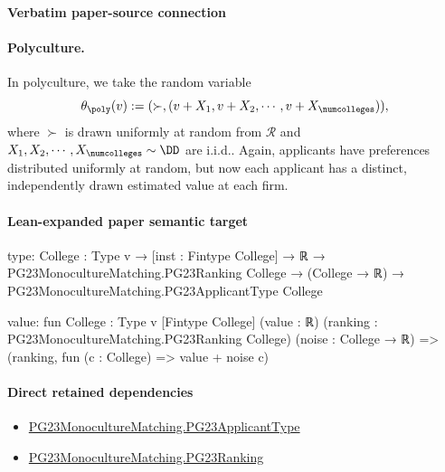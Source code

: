 \documentclass[10pt]{article}
\begin{document}
\paragraph{Verbatim paper-source connection}
\begin{ReviewVerbatim}
\paragraph{Polyculture.} In polyculture, we take the random variable
\begin{equation}
    \theta_{\poly}(v) := (\succ, (v + X_1, v + X_2, \cdots, v + X_\numcolleges)),
\end{equation}
where $\succ$ is drawn uniformly at random from $\mathcal{R}$ and $X_1,X_2,\cdots, X_\numcolleges \sim \DD$ are i.i.d.. Again, applicants have preferences distributed uniformly at random, but now each applicant has a distinct, independently drawn estimated value at each firm.
\end{ReviewVerbatim}



\paragraph{Lean-expanded paper semantic target}
\begin{ReviewVerbatim}
type:
{College : Type v} →
  [inst : Fintype College] →
    ℝ → PG23MonocultureMatching.PG23Ranking College → (College → ℝ) → PG23MonocultureMatching.PG23ApplicantType College

value:
fun {College : Type v} [Fintype College] (value : ℝ) (ranking : PG23MonocultureMatching.PG23Ranking College)
    (noise : College → ℝ) =>
  (ranking, fun (c : College) => value + noise c)
\end{ReviewVerbatim}

\paragraph{Direct retained dependencies}
\begin{itemize}\raggedright
\item \hyperlink{paper-prerequisite-40ad59c353cf95ec}{PG23\allowbreak{}Monoculture\allowbreak{}Matching.\allowbreak{}PG23\allowbreak{}Applicant\allowbreak{}Type}
\item \hyperlink{paper-prerequisite-8769258a80216d15}{PG23\allowbreak{}Monoculture\allowbreak{}Matching.\allowbreak{}PG23\allowbreak{}Ranking}
\end{itemize}
\end{document}
